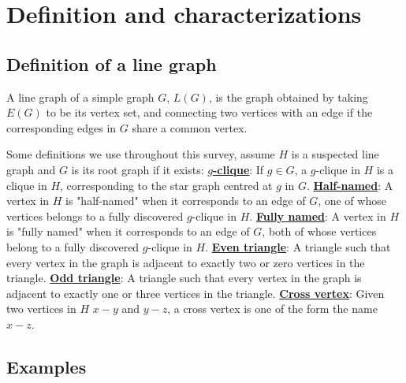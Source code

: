 \documentclass[11pt]{article}
\begin{document}
\section{Definition and characterizations}

\subsection{Definition of a line graph}

A line graph of a simple graph $G$, $L(G)$, is the graph obtained by taking $E(G)$ to be its vertex set, and connecting two vertices with an edge if the corresponding edges in $G$ share a common vertex.

Some definitions we use throughout this survey, assume $H$ is a suspected line graph and $G$ is its root graph if it exists:
\newline
\underline{\textbf{$g$-clique}}: If $g\in G$, a $g$-clique in $H$ is a clique in $H$, corresponding to the star graph centred at $g$ in $G$.
\newline
\underline{\textbf{Half-named}}: A vertex in $H$ is "half-named" when it corresponds to an edge of $G$, one of whose vertices belongs to a fully
discovered $g$-clique in $H$.
\newline
\underline{\textbf{Fully named}}: A vertex in $H$ is "fully named" when it corresponds to an edge of $G$, both of whose vertices belong to a fully discovered $g$-clique in $H$.
\newline
\underline{\textbf{Even triangle}}: A triangle such that every vertex in the graph is adjacent to exactly two or zero vertices in the triangle.
\newline
\underline{\textbf{Odd triangle}}: A triangle such that every vertex in the graph is adjacent to exactly one or three vertices in the triangle.
\newline
\underline{\textbf{Cross vertex}}: Given two vertices in $H$ $x-y$ and $y-z$, a cross vertex is one of the form the name $x-z$.


\subsection{Examples}

\begin{figure}[H]
\centering

\end{figure}
\begin{figure}[H]
\centering

\end{figure}
\end{document}
